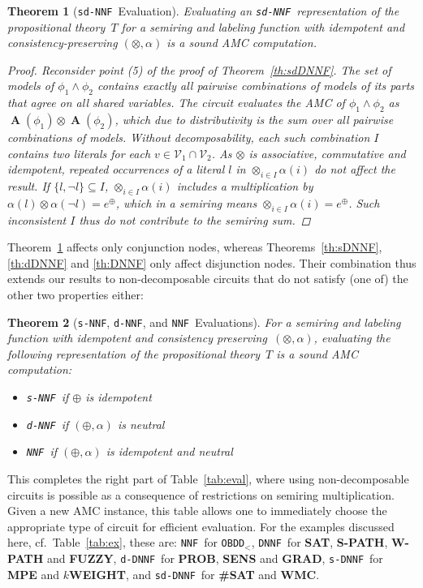 \documentclass{article}
\theoremstyle{plain}
\newtheorem{theorem}{Theorem}
\theoremstyle{definition}
\newcommand{\NNF}{{\tt NNF}}
\newcommand{\dNNF}{{\tt d-NNF}}
\newcommand{\sNNF}{{\tt s-NNF}}
\newcommand{\DNNF}{{\tt DNNF}}
\newcommand{\dDNNF}{{\tt d-DNNF}}
\newcommand{\sDNNF}{{\tt s-DNNF}}
\newcommand{\sdDNNF}{{\tt sd-DNNF}}
\newcommand{\sdNNF}{{\tt sd-NNF}}
\newcommand{\OBDDo}{{\tt OBDD$_<$}}
\begin{document}
\begin{theorem}[\sdNNF\ Evaluation]\label{th:sdNNF}
 Evaluating an \sdNNF\ representation of the propositional theory~$T$
 for a semiring and labeling function with  idempotent and
  consistency-preserving $(\otimes,\alpha)$ is a sound AMC computation.
 \begin{proof}
 Reconsider point (5) of the proof of Theorem~\ref{th:sdDNNF}.
The set of models of  $\phi_1\wedge\phi_2$ contains exactly all
pairwise combinations of models of its parts that agree on all shared variables.
The circuit evaluates the AMC of  $\phi_1\wedge\phi_2$ as
$\operatorname{\mathbf{A}}(\phi_1)\otimes
\operatorname{\mathbf{A}}(\phi_2)$, which due to distributivity is the
sum over all pairwise combinations of models. Without
decomposability, each such combination $I$ contains two literals for each $v\in
\mathcal{V}_1\cap\mathcal{V}_2$. As $\otimes$ is associative, commutative
and idempotent, repeated occurrences of a literal $l$ in
$\otimes_{i\in I}\alpha(i)$ do not affect the result. If $\{l,\neg
l\}\subseteq I$, $\otimes_{i\in I}\alpha(i)$ includes a multiplication by
$\alpha(l)\otimes\alpha(\neg l) = e^{\oplus}$, which in a semiring
means $\otimes_{i\in I}\alpha(i)  = e^{\oplus}$. Such inconsistent $I$ thus  do not
contribute to the semiring sum.
 \end{proof}
\end{theorem}
Theorem~\ref{th:sdNNF} affects only conjunction nodes, whereas
Theorems~\ref{th:sDNNF}, \ref{th:dDNNF} and \ref{th:DNNF} only affect
disjunction nodes. Their combination thus extends our results to 
non-decomposable circuits that do not satisfy (one of) the other two properties either:
\begin{theorem}[\sNNF, \dNNF, and \NNF\ Evaluations]\label{th:NNF}
 For a semiring and labeling function with idempotent and
  consistency preserving~$(\otimes,\alpha)$, evaluating the following representation of the propositional theory~$T$
  is a sound AMC computation:
\begin{itemize}
\item \sNNF\ if $\oplus$ is idempotent
\item \dNNF\ if $(\oplus,\alpha)$ is neutral
\item \NNF\ if $(\oplus,\alpha)$ is idempotent and neutral
\end{itemize}
\end{theorem}

This completes the right part of Table~\ref{tab:eval}, where using non-decomposable circuits is possible as a consequence of
restrictions on semiring multiplication. 
Given a new AMC instance, this table allows one  to immediately
choose the appropriate type of circuit for efficient
evaluation. For the examples discussed here, cf.~Table~\ref{tab:ex}, these are: \NNF\
for \OBDDo, \DNNF\ for  \textbf{SAT}, \textbf{S-PATH}, \textbf{W-PATH}
and \textbf{FUZZY}, \dDNNF\ for \textbf{PROB},
\textbf{SENS} and \textbf{GRAD}, \sDNNF\ for \textbf{MPE} and 
\textbf{$k$WEIGHT}, and \sdDNNF\ for \textbf{\#SAT} and \textbf{WMC}. 
\end{document}
